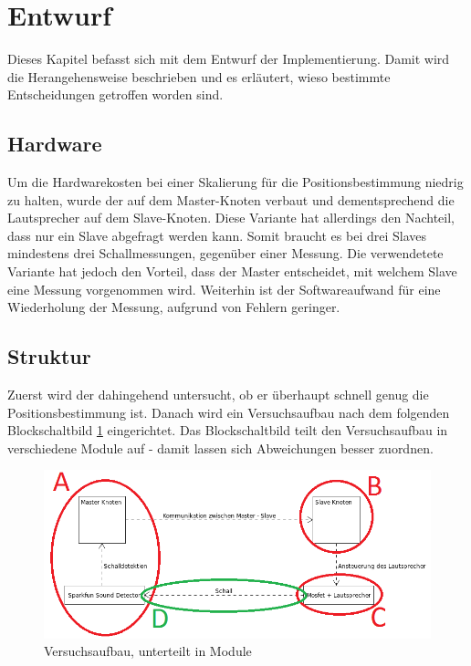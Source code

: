 \newpage
\section{Entwurf}
Dieses Kapitel befasst sich mit dem Entwurf der Implementierung. Damit wird die Herangehensweise beschrieben und es erläutert, wieso bestimmte Entscheidungen getroffen worden sind.

\subsection{Hardware}
Um die Hardwarekosten bei einer Skalierung für die Positionsbestimmung niedrig zu halten, wurde der \microphone \platz auf dem Master-Knoten verbaut und dementsprechend die Lautsprecher auf dem Slave-Knoten. Diese Variante hat allerdings den Nachteil, dass nur ein Slave abgefragt werden kann. Somit braucht es bei drei Slaves mindestens drei Schallmessungen, gegenüber einer Messung. Die verwendetete Variante hat jedoch den Vorteil, dass der Master entscheidet, mit welchem Slave eine Messung vorgenommen wird. Weiterhin ist der Softwareaufwand für eine Wiederholung der Messung, aufgrund von Fehlern geringer.

\subsection{Struktur}
Zuerst wird der \microphone \platz dahingehend untersucht, ob er überhaupt schnell genug die Positionsbestimmung ist. Danach wird ein Versuchsaufbau nach dem folgenden Blockschaltbild \ref{img:kommunikation_module} eingerichtet. Das Blockschaltbild teilt den Versuchsaufbau in verschiedene Module auf - damit lassen sich Abweichungen besser zuordnen.

\begin{figure}[H]
	\centering
	\hspace*{-2.6cm}
	\includegraphics[width=1.3\textwidth]{images/Kommunikation_Module.png}
	\caption{Versuchsaufbau, unterteilt in Module}
	\label{img:kommunikation_module}
\end{figure}

